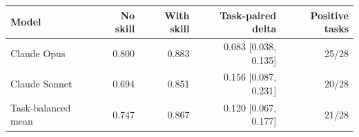 \begin{tabular}{lrrrr}
\toprule
Model & No skill & With skill & Task-paired delta & Positive tasks \\
\midrule
Claude Opus & 0.800 & 0.883 & 0.083 [0.038, 0.135] & 25/28 \\
Claude Sonnet & 0.694 & 0.851 & 0.156 [0.087, 0.231] & 20/28 \\
Task-balanced mean & 0.747 & 0.867 & 0.120 [0.067, 0.177] & 21/28 \\
\bottomrule
\end{tabular}
